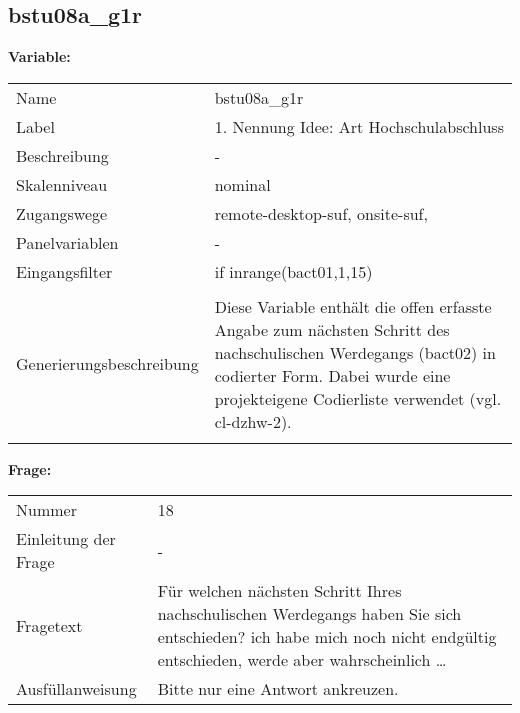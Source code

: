 	
	
	\subsection{bstu08a\_g1r}
	\label{subSection:bstu08a_g1r}

	\noindent\textbf{Variable:}\\
		\begin{tabular}{lL{11.3cm}}
			\label{tableVariable:bstu08a_g1r}
			Name & bstu08a\_g1r \\
			Label & 1. Nennung Idee: Art Hochschulabschluss \\
			Beschreibung & - \\
			Skalenniveau & nominal \\
			Zugangswege &
				remote-desktop-suf,
				onsite-suf,
 \\
			Panelvariablen & -
			 \\
			Eingangsfilter & if inrange(bact01,1,15) \\
 \\
					Generierungsbeschreibung & Diese Variable enthält die offen erfasste Angabe zum nächsten Schritt des nachschulischen Werdegangs (bact02) in codierter Form. Dabei wurde eine projekteigene Codierliste verwendet (vgl. cl-dzhw-2).
				 \\	
			 \\
		\end{tabular}

		\vspace*{1 cm}
		\noindent\textbf{Frage:}\\
		\begin{tabular}{lL{11.3cm}}
			\label{tableQuestion:bstu08a_g1r}
			Nummer & 18 \\
			Einleitung der Frage & - \\
			Fragetext & Für welchen nächsten Schritt Ihres nachschulischen Werdegangs haben Sie sich entschieden?
ich habe mich noch nicht endgültig entschieden, werde aber wahrscheinlich … \\
			Ausfüllanweisung & Bitte nur eine Antwort ankreuzen. \\
		\end{tabular}





